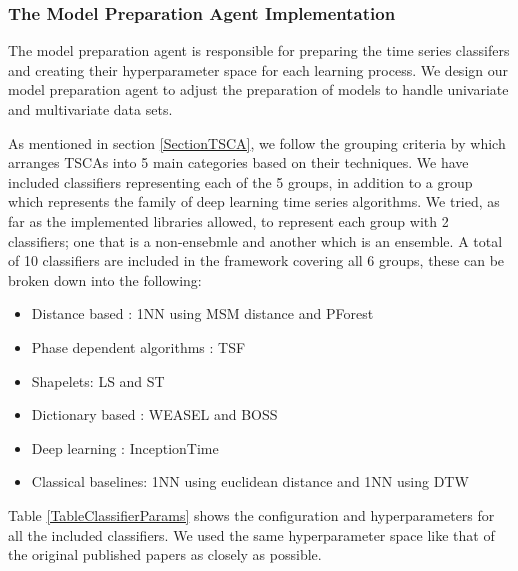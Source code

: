 \subsubsection*{The Model Preparation Agent Implementation}
\label{ModelPreparationAgentImplementation}
The model preparation agent is responsible for preparing the time series classifers and creating their hyperparameter space for each learning process.
We design our model preparation agent to adjust the preparation of models to handle univariate and multivariate data sets.

As mentioned in section \ref{SectionTSCA}, we follow the grouping criteria by \cite{bagnall2017great} which arranges TSCAs into 5 main categories based on their techniques.
We have included classifiers representing each of the 5 groups, in addition to a  group which represents the family of deep learning time series algorithms.
We tried, as far as the implemented libraries allowed, to represent each group with 2 classifiers; one that is a non-ensebmle and another which is an ensemble.
A total of 10 classifiers are included in the framework covering all 6 groups, these can be broken down into the following:
\begin{itemize}
  \item Distance based : 1NN using MSM distance and PForest
  \item Phase dependent algorithms : TSF
  \item Shapelets: LS and ST
  \item Dictionary based : WEASEL and BOSS
  \item Deep learning : InceptionTime
  \item Classical baselines: 1NN using euclidean distance and 1NN using DTW
\end{itemize}

Table \ref{TableClassifierParams} shows the configuration and hyperparameters for all the included classifiers.
We used the same hyperparameter space like that of the original published papers as closely as possible.

